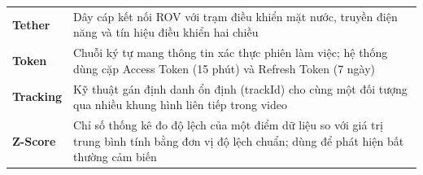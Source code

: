\documentclass[../DoAn.tex]{subfiles}
\begin{document}
\begin{longtable}{p{4.0cm} p{10.5cm}}
    \textbf{Tether} & Dây cáp kết nối ROV với trạm điều khiển mặt nước, truyền điện năng và tín hiệu điều khiển hai chiều \\
    \textbf{Token} & Chuỗi ký tự mang thông tin xác thực phiên làm việc; hệ thống dùng cặp Access Token (15 phút) và Refresh Token (7 ngày) \\
    \textbf{Tracking} & Kỹ thuật gán định danh ổn định (trackId) cho cùng một đối tượng qua nhiều khung hình liên tiếp trong video \\
    \textbf{Z-Score} & Chỉ số thống kê đo độ lệch của một điểm dữ liệu so với giá trị trung bình tính bằng đơn vị độ lệch chuẩn; dùng để phát hiện bất thường cảm biến \\ \hline
\end{longtable}
\end{document}

